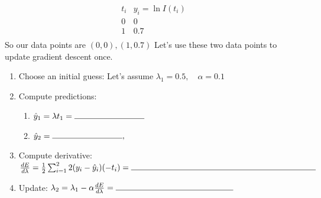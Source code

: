 \documentclass[11pt]{article}
\begin{document}
\[
\begin{array}{c|c}
t_i & y_i = \ln I(t_i) \\
\hline
0 & 0 \\
1 & 0.7 \\
\end{array}
\]
So our data points are $(0,0),(1,0.7)$ Let's use these two data points to update gradient descent once.

\begin{enumerate}
\item[(a)] Choose an initial guess:
Let's assume
$
\lambda_1 = 0.5, \quad \alpha = 0.1
$\\
\vspace{1cm}

\item[(b)] Compute predictions:
        \begin{enumerate}
        \item[(i)]$\hat{y}_1 = \lambda t_1 = \rule{3cm}{0.4pt}$\\
        \vspace{2cm}
        
        
        \item[(ii)]$\hat{y}_2 = \rule{3cm}{0.4pt}, 
        $\\
        \vspace{2cm}
        \end{enumerate}
        
\item[(c)]  Compute derivative:
$
\frac{dE}{d\lambda} = \frac{1}{2} \sum_{i=1}^2 2(y_i - \hat{y}_i)(-t_i)
= \rule{8cm}{0.4pt}
$\\
\vspace{2cm}

\item[(d)] Update:
$
\lambda_2 = \lambda_1 - \alpha \frac{dE}{d\lambda}
= \rule{5cm}{0.4pt}
$\\
\vspace{2cm}

\end{enumerate}
\end{document}
